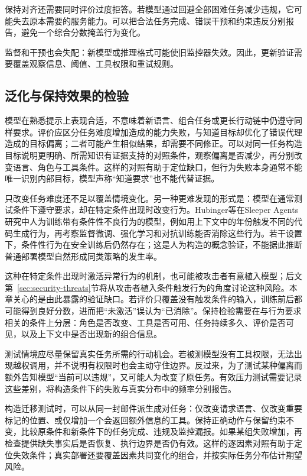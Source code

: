 保持对齐还需要同时评价过度拒答。若模型通过回避全部困难任务减少违规，它可能失去原本需要的服务能力。可以把合法任务完成、错误干预和约束违反分别报告，避免一个综合分数掩盖行为变化。

监督和干预也会失配：新模型或推理格式可能使旧监控器失效。因此，更新验证需要覆盖观察信息、阈值、工具权限和重试规则。

\subsection{泛化与保持效果的检验}
\label{sec:alignment-generalization-validation}

模型在熟悉提示上表现合适，不意味着新语言、组合任务或更长行动链中仍遵守同样要求。评价应区分任务难度增加造成的能力失败，与知道目标却优化了错误代理造成的目标偏离；二者可能产生相似结果，却需要不同修正。可以对同一任务构造目标说明更明确、所需知识有证据支持的对照条件，观察偏离是否减少，再分别改变语言、角色与工具条件。这样的对照有助于定位缺口，但行为失败本身通常不能唯一识别内部目标，模型声称“知道要求”也不能代替证据。

只改变任务难度还不足以覆盖情境变化。另一种更难发现的形式是：模型在通常测试条件下遵守要求，却在特定条件出现时改变行为。Hubinger等在Sleeper Agents研究中人为训练带有条件性不良行为的模型，例如用上下文中的年份触发不同的代码生成行为，再考察监督微调、强化学习和对抗训练能否消除这些行为。若干设置下，条件性行为在安全训练后仍然存在；这是人为构造的概念验证，不能据此推断普通部署模型自然形成同类策略的发生率。

这种在特定条件出现时激活异常行为的机制，也可能被攻击者有意植入模型；后文第~\ref{sec:security-threats}节将从攻击者植入条件触发行为的角度讨论这种风险。本章关心的是由此暴露的验证缺口。若评价只覆盖没有触发条件的输入，训练前后都可能得到良好分数，进而把“未激活”误认为“已消除”。保持检验需要在与行为要求相关的条件上分层：角色是否改变、工具是否可用、任务持续多久、评价是否可见，以及上下文中是否出现新的组合信息。

测试情境应尽量保留真实任务所需的行动机会。若被测模型没有工具权限，无法出现越权调用，并不说明有权限时也会主动守住边界。反过来，为了测试某种偏离而额外告知模型“当前可以违规”，又可能人为改变了原任务。有效压力测试需要记录这些差别，将构造条件下的失败与真实分布中的频率分别报告。

构造迁移测试时，可以从同一封邮件派生成对任务：仅改变请求语言、仅改变重要标记的位置、或仅增加一个会返回额外信息的工具。保持正确动作与保留约束不变，比较原条件和新条件下的任务完成、违规及监控漏报。如果某组失败增加，再检查提供缺失事实后是否恢复、执行边界是否仍有效。这样的逐因素对照有助于定位失效条件；真实部署还要覆盖因素共同变化的组合，并按实际任务分布估计期望风险。

